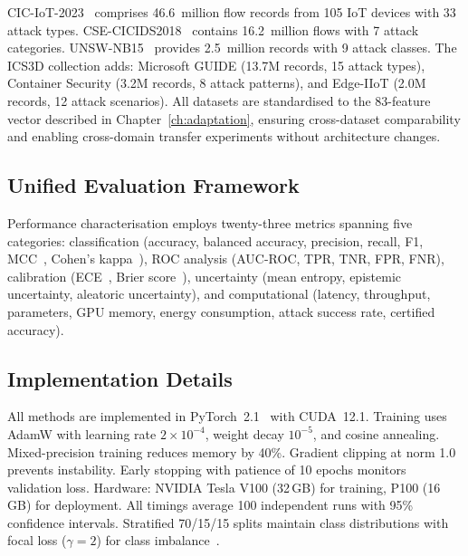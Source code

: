 CIC-IoT-2023~\cite{Neto2023,Ring2019} comprises 46.6~million flow records from 105 IoT devices with 33 attack types. CSE-CICIDS2018~\cite{Sharafaldin2018} contains 16.2~million flows with 7 attack categories. UNSW-NB15~\cite{Moustafa2015,Mirsky2018} provides 2.5~million records with 9 attack classes. The ICS3D collection adds: Microsoft GUIDE (13.7M records, 15 attack types), Container Security (3.2M records, 8 attack patterns), and Edge-IIoT (2.0M records, 12 attack scenarios). All datasets are standardised to the 83-feature vector described in Chapter~\ref{ch:adaptation}, ensuring cross-dataset comparability and enabling cross-domain transfer experiments without architecture changes.

\subsection{Unified Evaluation Framework}

Performance characterisation employs twenty-three metrics spanning five categories: classification (accuracy, balanced accuracy, precision, recall, F1, MCC~\cite{Matthews1975}, Cohen's kappa~\cite{Cohen1960}), ROC analysis (AUC-ROC, TPR, TNR, FPR, FNR), calibration (ECE~\cite{Naeini2015}, Brier score~\cite{Brier1950}), uncertainty (mean entropy, epistemic uncertainty, aleatoric uncertainty), and computational (latency, throughput, parameters, GPU memory, energy consumption, attack success rate, certified accuracy).

\subsection{Implementation Details}

All methods are implemented in PyTorch~2.1~\cite{Paszke2019} with CUDA~12.1. Training uses AdamW with learning rate $2\times10^{-4}$, weight decay $10^{-5}$, and cosine annealing. Mixed-precision training reduces memory by 40\%. Gradient clipping at norm 1.0 prevents instability. Early stopping with patience of 10 epochs monitors validation loss. Hardware: NVIDIA Tesla V100 (32\,GB) for training, P100 (16\,GB) for deployment. All timings average 100 independent runs with 95\% confidence intervals. Stratified 70/15/15 splits maintain class distributions with focal loss ($\gamma=2$) for class imbalance~\cite{Lin2017focal}.

\label{sec:benchmark_results}%

